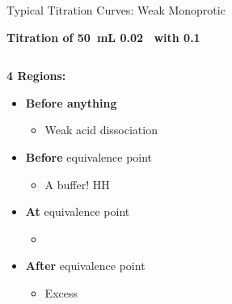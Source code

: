 \documentclass[handout]{beamer}
\begin{document}
\begin{frame}[t]{Typical Titration Curves: Weak Monoprotic}
	\begin{center}
		\bfseries
		Titration of \SI{50}{\milli\liter}
		\SI{0.02}{\Molar}~ with
		\SI{0.1}{\Molar}~
	\end{center}

	\begin{columns}[t]
		
		\begin{block}{\bfseries 4 Regions:}
			\begin{itemize}
				\item \textbf{Before anything}
					\begin{itemize}
						\item<2-> Weak acid dissociation
					\end{itemize}
				\item \textbf{Before} equivalence point
					\begin{itemize}
						\item<3-> A buffer! \alert{HH}
					\end{itemize}
				\item \textbf{At} equivalence point
					\begin{itemize}
						\item<4-> \ch{[NaOH] = [HA]}
					\end{itemize}
				\item \textbf{After} equivalence point
					\begin{itemize}
						\item<5-> Excess 
					\end{itemize}
			\end{itemize}
		\end{block}
	\end{columns}
\end{frame}

\end{document}
